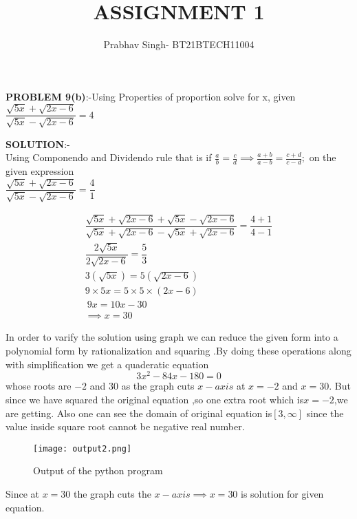 \documentclass[journal,12pt,twocolumn]{IEEEtran}
\begin{document}
	\vspace{3cm}
	\title{ASSIGNMENT 1}
	\author{Prabhav Singh- BT21BTECH11004}
	
	\maketitle
	\textbf{PROBLEM 9(b)}:-Using Properties of proportion solve for x, given\\
	
	
	\hspace*{2cm}$ 	\dfrac{\sqrt{5x}+\sqrt{2x-6}}{\sqrt{5x}-\sqrt{2x-6}} =4 $
	
	
	\medskip
	
	
	\textbf{SOLUTION}:-\\
	Using Componendo and Dividendo rule that is if $  \frac{a}{b} =\frac{c}{d} \implies \frac{a+b}{a-b} =\frac{c+d}{c-d}; $ on the given expression\\
	
	 $	\dfrac{\sqrt{5x}+\sqrt{2x-6}}{\sqrt{5x}-\sqrt{2x-6}} =\dfrac{4}{1} $
	
	\begin{align}
		\dfrac{\sqrt{5x}+\sqrt{2x-6}+\sqrt{5x}-\sqrt{2x-6}}{\sqrt{5x}+\sqrt{2x-6}-\sqrt{5x}+\sqrt{2x-6}} =\dfrac{4+1}{4-1} \\ 
		\dfrac{2\sqrt{5x}}{2\sqrt{2x-6}} =\dfrac{5}{3} \\
		3(\sqrt{5x})=5(\sqrt{2x-6}) \\
		9\times5x=5\times5\times(2x-6) \\
		\ 9x=10x-30 \\
		\implies \boxed{ x=30} 
	\end{align}
	
	\medskip
	
	In order to varify the solution using graph we can reduce the given form into a polynomial form by rationalization and squaring .By doing these operations along with simplification we get a quaderatic equation 
	\begin{equation}
		3x^{2}-84x-180=0
	\end{equation}
whose roots are $ -2 $ and $ 30 $ as the graph cuts $  x- axis $ at $  x= -2 $ and $ x=30 $. But since we have squared the original equation ,so one extra root which is$  x= -2  $,we are getting. Also one can see the domain of original equation is$  [3,\infty] $ since the value inside square root cannot be negative real number. 
	\begin{figure}[h]
		
		\texttt{[image: output2.png]}
		
		\caption{Output of the python program}
		
	\end{figure}
	
	Since at $ x=30 $ the graph cuts the $ x-axis \implies x=30 $ is solution for given equation.
\end{document}
